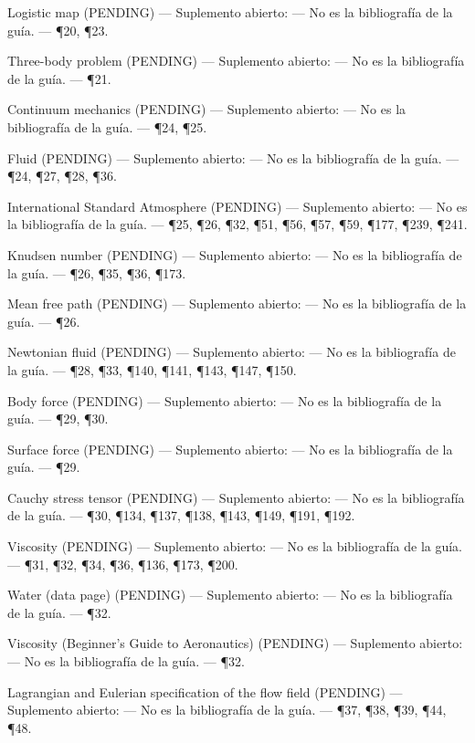 \documentclass[10pt,openany]{book}
\begin{document}
\noindent Logistic map (PENDING) --- Suplemento abierto: --- No es la bibliografía de la guía. --- \P20, \P23.\par
\noindent Three-body problem (PENDING) --- Suplemento abierto: --- No es la bibliografía de la guía. --- \P21.\par
\noindent Continuum mechanics (PENDING) --- Suplemento abierto: --- No es la bibliografía de la guía. --- \P24, \P25.\par
\noindent Fluid (PENDING) --- Suplemento abierto: --- No es la bibliografía de la guía. --- \P24, \P27, \P28, \P36.\par
\noindent International Standard Atmosphere (PENDING) --- Suplemento abierto: --- No es la bibliografía de la guía. --- \P25, \P26, \P32, \P51, \P56, \P57, \P59, \P177, \P239, \P241.\par
\noindent Knudsen number (PENDING) --- Suplemento abierto: --- No es la bibliografía de la guía. --- \P26, \P35, \P36, \P173.\par
\noindent Mean free path (PENDING) --- Suplemento abierto: --- No es la bibliografía de la guía. --- \P26.\par
\noindent Newtonian fluid (PENDING) --- Suplemento abierto: --- No es la bibliografía de la guía. --- \P28, \P33, \P140, \P141, \P143, \P147, \P150.\par
\noindent Body force (PENDING) --- Suplemento abierto: --- No es la bibliografía de la guía. --- \P29, \P30.\par
\noindent Surface force (PENDING) --- Suplemento abierto: --- No es la bibliografía de la guía. --- \P29.\par
\noindent Cauchy stress tensor (PENDING) --- Suplemento abierto: --- No es la bibliografía de la guía. --- \P30, \P134, \P137, \P138, \P143, \P149, \P191, \P192.\par
\noindent Viscosity (PENDING) --- Suplemento abierto: --- No es la bibliografía de la guía. --- \P31, \P32, \P34, \P36, \P136, \P173, \P200.\par
\noindent Water (data page) (PENDING) --- Suplemento abierto: --- No es la bibliografía de la guía. --- \P32.\par
\noindent Viscosity (Beginner's Guide to Aeronautics) (PENDING) --- Suplemento abierto: --- No es la bibliografía de la guía. --- \P32.\par
\noindent Lagrangian and Eulerian specification of the flow field (PENDING) --- Suplemento abierto: --- No es la bibliografía de la guía. --- \P37, \P38, \P39, \P44, \P48.\par
\end{document}
